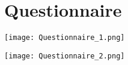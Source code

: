 \chapter{Questionnaire}
\label{app: Appendix B}

% 
\vspace{-1.8cm}
\texttt{[image: Questionnaire\_1.png]}

\texttt{[image: Questionnaire\_2.png]}
% 
